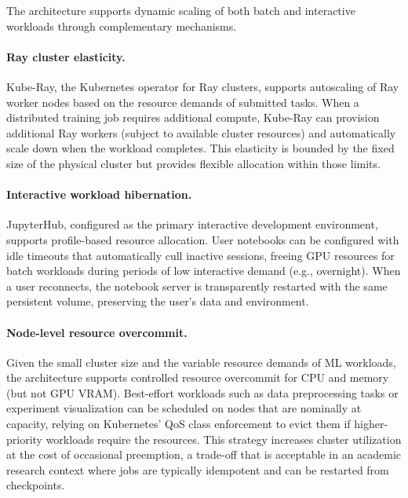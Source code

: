 The architecture supports dynamic scaling of both batch and interactive workloads through complementary mechanisms.

\paragraph{Ray cluster elasticity.} Kube-Ray, the Kubernetes operator for Ray clusters, supports autoscaling of Ray worker nodes based on the resource demands of submitted tasks. When a distributed training job requires additional compute, Kube-Ray can provision additional Ray workers (subject to available cluster resources) and automatically scale down when the workload completes. This elasticity is bounded by the fixed size of the physical cluster but provides flexible allocation within those limits.

\paragraph{Interactive workload hibernation.} JupyterHub, configured as the primary interactive development environment, supports profile-based resource allocation. User notebooks can be configured with idle timeouts that automatically cull inactive sessions, freeing GPU resources for batch workloads during periods of low interactive demand (e.g., overnight). When a user reconnects, the notebook server is transparently restarted with the same persistent volume, preserving the user's data and environment.

\paragraph{Node-level resource overcommit.} Given the small cluster size and the variable resource demands of ML workloads, the architecture supports controlled resource overcommit for CPU and memory (but not GPU VRAM). Best-effort workloads such as data preprocessing tasks or experiment visualization can be scheduled on nodes that are nominally at capacity, relying on Kubernetes' QoS class enforcement to evict them if higher-priority workloads require the resources. This strategy increases cluster utilization at the cost of occasional preemption, a trade-off that is acceptable in an academic research context where jobs are typically idempotent and can be restarted from checkpoints.
